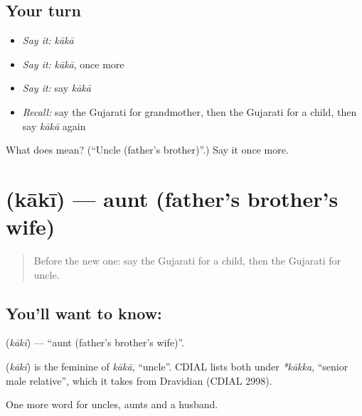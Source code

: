 \subsection*{Your turn}
\begin{itemize}
\raggedright
  \item \emph{Say it:} \emph{kākā}
  \item \emph{Say it:} \emph{kākā}, once more
  \item \emph{Say it:} say \emph{kākā}
  \item \emph{Recall:} say the Gujarati for grandmother, then the Gujarati for a child, then say \emph{kākā} again
\end{itemize}

\begin{tcolorbox}[breakable,colback=teal!4,colframe=teal!35!black,title={Before you move on}]
What does  mean? (\textquotedblleft{}Uncle (father's brother)\textquotedblright{}.) Say it once more.
\end{tcolorbox}
\section[\texorpdfstring{\gu{કાકી} (kākī)}{કાકી (kākī)}]{ (kākī) — aunt (father's brother's wife)}

\label{lesson:GU-C52-kaki}



\begin{quote}
Before the new one: say the Gujarati for a child, then the Gujarati for uncle.
\end{quote}

\subsection*{You'll want to know: }
\textbf{} (\emph{kākī}) — \textquotedblleft{}aunt (father's brother's wife)\textquotedblright{}.

\begin{cousinweb}
\textbf{} (\emph{kākī}) is the feminine of \emph{kākā}, \textquotedblleft{}uncle\textquotedblright{}. CDIAL lists both under \emph{*kākka}, \textquotedblleft{}senior male relative\textquotedblright{}, which it takes from Dravidian (CDIAL 2998).
\end{cousinweb}

\begin{grammarlens}[title={What you've built}]
One more word for uncles, aunts and a husband.
\end{grammarlens}

